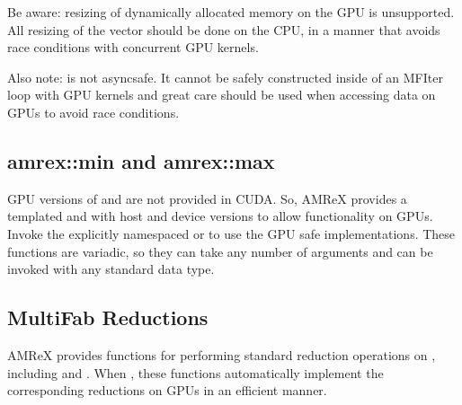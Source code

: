 \documentclass[letterpaper,10pt,english]{sphinxmanual}
\begin{document}
\sphinxAtStartPar
Be aware: resizing of dynamically allocated memory on the GPU is unsupported.
All resizing of the vector should be done on the CPU, in a manner that avoids
race conditions with concurrent GPU kernels.

\sphinxAtStartPar
Also note:  is not async\sphinxhyphen{}safe.  It cannot be safely
constructed inside of an MFIter loop with GPU kernels and great care should
be used when accessing  data on GPUs to avoid race
conditions.


\subsection{amrex::min and amrex::max}
\label{\detokenize{GPU:amrex-min-and-amrex-max}}
\sphinxAtStartPar
GPU versions of  and  are not provided in CUDA.
So, AMReX provides a templated  and  with host and
device versions to allow functionality on GPUs. Invoke the explicitly
namespaced  or  to use the
GPU safe implementations. These functions are variadic, so they can take
any number of arguments and can be invoked with any standard data type.


\subsection{MultiFab Reductions}
\label{\detokenize{GPU:multifab-reductions}}
\sphinxAtStartPar
AMReX provides functions for performing standard reduction operations on
, including  and .
When , these functions automatically implement the
corresponding reductions on GPUs in an efficient manner.
\end{document}
